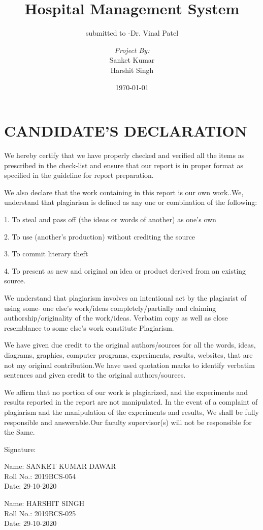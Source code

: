 \documentclass[a4paper, 14pt]{report}
\institute{IIITM- Gwalior}
\title{Hospital Management System}
\subtitle{submitted to -Dr. Vinal Patel}
\author{\textit{Project By:}\\ Sanket Kumar \\ Harshit Singh}
\date{\today}
\begin{document}
\maketitle
\romantableofcontents
\chapter{CANDIDATE'S DECLARATION}
{\large
We hereby certify that we have properly checked and verified all the items as prescribed in
the check-list and ensure that our report is in proper format as specified in the
guideline for report preparation.

We also declare that the work containing in this report is our own work..We, understand
that plagiarism is defined as any one or combination of the following:

   1. To steal and pass off (the ideas or words of another) as one's own

   2. To use (another's production) without crediting the source

   3. To commit literary theft

   4. To present as new and original an idea or product derived from an existing source.

We understand that plagiarism involves an intentional act by the plagiarist of using some-
one else's work/ideas completely/partially and claiming authorship/originality of the
work/ideas. Verbatim copy as well as close resemblance to some else's work constitute
Plagiarism.

We have given due credit to the original authors/sources for all the words, ideas, diagrams,
graphics, computer programs, experiments, results, websites, that are not my original
contribution.We have used quotation marks to identify verbatim sentences and given
credit to the original authors/sources.

We affirm that no portion of our work is plagiarized, and the experiments and results
reported in the report are not manipulated. In the event of a complaint of plagiarism and the manipulation of the experiments and results, We shall be fully responsible and answerable.Our faculty supervisor(s) will not be responsible for the
Same.

Signature:

Name: SANKET KUMAR DAWAR
\\Roll No.: 2019BCS-054
\\Date: 29-10-2020

Name: HARSHIT SINGH
\\Roll No.: 2019BCS-025
\\Date: 29-10-2020
}
\newpage
\end{document}
